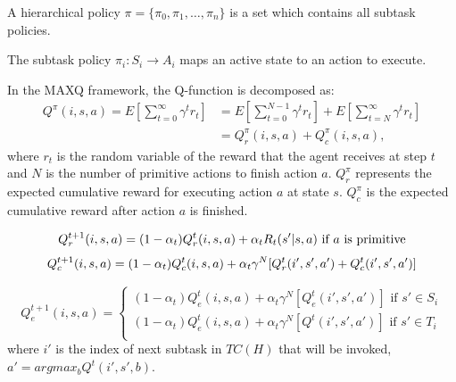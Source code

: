 \begin{definition}
A hierarchical policy $\pi = \{\pi_0, \pi_1, \dots, \pi_n\}$ is a set which contains all subtask policies. 
\end{definition}
The subtask policy $\pi_i: S_i \rightarrow A_i$ maps an active state to an action to execute.


In the MAXQ framework, the Q-function is decomposed as:
\begin{align}
    Q^{\pi}(i, s, a) = E[\sum_{t=0}^{\infty}\gamma^t r_t] &= E[\sum_{t=0}^{N - 1}\gamma^t r_t] + E[\sum_{t=N}^{\infty}\gamma^t r_t]\\
                    &= Q_r^{\pi}(i, s, a) + Q_c^{\pi}(i, s, a),
\end{align}
where $r_t$ is the random variable of the reward that the agent receives at step $t$ and $N$ is the number of primitive actions to finish action $a$.
$ Q_r^{\pi}$ represents the expected cumulative reward for executing action $a$ at state $s$.
$Q_c^{\pi}$ is the expected cumulative reward after action $a$ is finished.

\begin{equation}
    Q_r^{t+1}(i, s, a) =
    (1 - \alpha_t)Q_r^t(i, s, a) + \alpha_t R_t(s'| s, a)   \mbox{ if $a$ is primitive} \\
\end{equation}
\begin{equation}
    Q_c^{t+1}(i, s, a) =
    (1 - \alpha_t)Q_c^t(i, s, a) + \alpha_t \gamma^N[Q_r^{t}(i', s', a') + Q_c^t(i', s', a')] \\
\end{equation}

\begin{equation}
    Q_e^{t+1}(i, s, a) =
    \left\{\begin{array}{ll}
    (1 - \alpha_t)Q_e^{t}(i, s, a) + \alpha_t \gamma^N[Q_e^{t}(i', s', a')]  \mbox{ if $s' \in S_i$} \\
    (1 - \alpha_t)Q_e^{t}(i, s, a) + \alpha_t \gamma^N[Q^{t}(i', s', a')]  \mbox{ if $s' \in T_i$} \\
    \end{array} \right.
\end{equation}
where $i'$ is the index of next subtask in $TC(H)$ that will be invoked, $a' = arg max_b Q^t(i', s', b)$.

